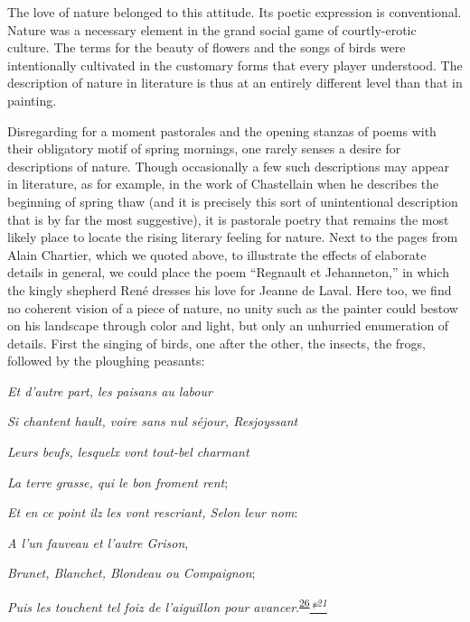\protect\hypertarget{21_Chapter_Thirteen__IMAGE_AND_WORD.xhtmlux5cux23page_351}{}{}The
love of nature belonged to this attitude. Its poetic expression is
conventional. Nature was a necessary element in the grand social game of
courtly-erotic culture. The terms for the beauty of flowers and the
songs of birds were intentionally cultivated in the customary forms that
every player understood. The description of nature in literature is thus
at an entirely different level than that in painting.

Disregarding for a moment pastorales and the opening stanzas of poems
with their obligatory motif of spring mornings, one rarely senses a
desire for descriptions of nature. Though occasionally a few such
descriptions may appear in literature, as for example, in the work of
Chastellain when he describes the beginning of spring thaw (and it is
precisely this sort of unintentional description that is by far the most
suggestive), it is pastorale poetry that remains the most likely place
to locate the rising literary feeling for nature. Next to the pages from
Alain Chartier, which we quoted above, to illustrate the effects of
elaborate details in general, we could place the poem ``Regnault et
Jehanneton,'' in which the kingly shepherd René dresses his love for
Jeanne de Laval. Here too, we find no coherent vision of a piece of
nature, no unity such as the painter could bestow on his landscape
through color and light, but only an unhurried enumeration of details.
First the singing of birds, one after the other, the insects, the frogs,
followed by the ploughing peasants:

\emph{Et d'autre part, les paisans au labour}

\emph{Si chantent hault, voire sans nul séjour, Resjoyssant}

\emph{Leurs beufs, lesquelx vont tout-bel charmant}

\emph{La terre grasse, qui le bon froment rent};

\emph{Et en ce point ilz les vont rescriant, Selon leur nom}:

\emph{A l'un fauveau et l'autre Grison},

\emph{Brunet, Blanchet, Blondeau ou Compaignon};

\emph{Puis les touchent tel foiz de l'aiguillon pour
avancer}.\textsuperscript{\protect\hypertarget{21_Chapter_Thirteen__IMAGE_AND_WORD.xhtmlux5cux23id_258}{\protect\hyperlink{23_NOTES.xhtmlux5cux23id_259}{26}}}\emph{\protect\hypertarget{21_Chapter_Thirteen__IMAGE_AND_WORD.xhtmlux5cux23id_2735}{\protect\hyperlink{23_NOTES.xhtmlux5cux23id_2736}{*\textsuperscript{21}}}}

